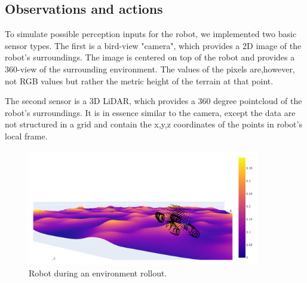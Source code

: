 \documentclass[a4paper,12pt]{article}
\begin{document}
\subsection{Observations and actions}
To simulate possible perception inputs for the robot, we implemented two basic sensor types. The first is a bird-view "camera", which provides a 2D image of the robot's surroundings. The image is centered on top of the robot and provides a 360-view of the surrounding environment. The values of the pixels are,however, not RGB values but rather the metric height of the terrain at that point. 

The second sensor is a 3D LiDAR, which provides a 360 degree pointcloud of the robot's surroundings. It is in essence similar to the camera, except the data are not structured in a grid and contain the x,y,z coordinates of the points in robot's local frame.

\begin{figure}[H]
  \centering
  \includegraphics[width=0.9\textwidth]{fig/robot_on_terrain.png}
  \caption{Robot during an environment rollout.}
\end{figure}
\end{document}
